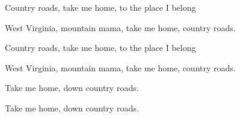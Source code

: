 \begin{song}
\bigskip

Country roads, take me home, to the place I belong \par
West Virginia, mountain mama, take me home, country roads. \par

\bigskip

Country roads, take me home, to the place I belong \par
West Virginia, mountain mama, take me home, country roads. \par

\bigskip

Take me home, down country roads. \par
Take me home, down country roads. \par

\end{song}
